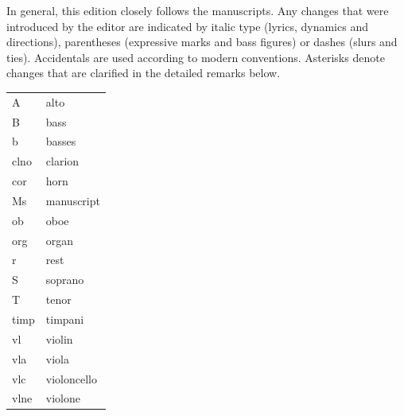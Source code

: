 \documentclass[parskip=full]{scrreprt}
\providecommand\printcriticalnotes{}
\providecommand\setscorelayout{}
\providecommand\printscores{}
\begin{document}
\cleardoublepage
\tableofcontents
\cleardoublepage



In general, this edition closely follows the manuscripts. Any changes that were introduced by the editor are indicated by italic type (lyrics, dynamics and directions), parentheses (expressive marks and bass figures) or dashes (slurs and ties). Accidentals are used according to modern conventions. Asterisks denote changes that are clarified in the detailed remarks below.


\begin{tabular}{@{} l l}
  A    & alto \\
  B    & bass \\
  b    & basses \\
  clno & clarion \\
  cor  & horn \\
  Ms   & manuscript \\
  ob   & oboe \\
  org  & organ \\
  r    & rest \\
  S    & soprano \\
  T    & tenor \\
  timp & timpani \\
  vl   & violin \\
  vla  & viola \\
  vlc  & violoncello \\
  vlne & violone \\
\end{tabular}

\fi %

\printcriticalnotes



\setscorelayout
\printscores
\end{document}
